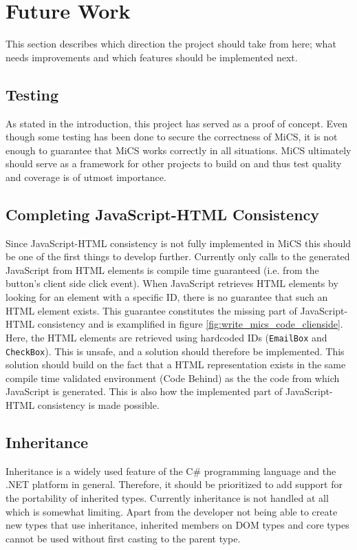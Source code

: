 
\section{Future Work}
\label{sec:futurework}
This section describes which direction the project should take from here; what needs improvements and which features should be implemented next.

\subsection{Testing} %
\label{sub:fw_testing}
	As stated in the introduction, this project has served as a proof of concept. Even though some testing has been done to secure the correctness of MiCS, it is not enough to guarantee that MiCS works correctly in all situations. MiCS ultimately should serve as a framework for other projects to build on and thus test quality and coverage is of utmost importance.

\subsection{Completing JavaScript-HTML Consistency} %
\label{sub:completing_javascript_html_consistency}
	Since JavaScript-HTML consistency is not fully implemented in MiCS this should be one of the first things to develop further. Currently only calls to the generated JavaScript from HTML elements is compile time guaranteed (i.e. from the button's client side click event). When JavaScript retrieves HTML elements by looking for an element with a specific ID, there is no guarantee that such an HTML element exists. This guarantee constitutes the missing part of JavaScript-HTML consistency and is examplified in figure \ref{fig:write_mics_code_clienside}. Here, the HTML elements are retrieved using hardcoded IDs (\texttt{EmailBox} and \texttt{CheckBox}). This is unsafe, and a solution should therefore be implemented. This solution should build on the fact that a HTML representation exists in the same compile time validated environment (Code Behind) as the the code from which JavaScript is generated. This is also how the implemented part of JavaScript-HTML consistency is made possible.

\subsection{Inheritance} %
\label{sub:fw_inheritance}
	Inheritance is a widely used feature of the C\# programming language and the .NET platform in general. Therefore, it should be prioritized to add support for the portability of inherited types. Currently inheritance is not handled at all which is somewhat limiting. Apart from the developer not being able to create new types that use inheritance, inherited members on DOM types and core types cannot be used without first casting to the parent type.

